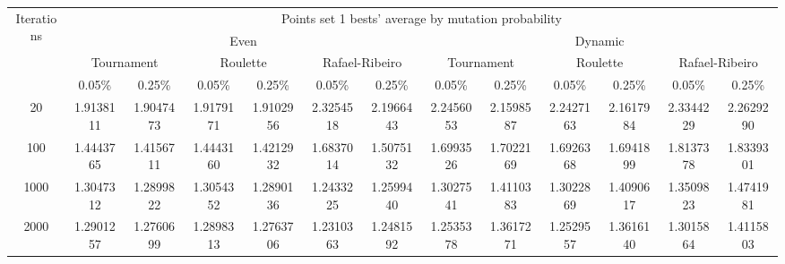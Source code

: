 \begin{center}
	\begin{tabular}{|c|c|c|c|c|c|c|c|c|c|c|c|c|}
		\hline
		\multirow{4}{*}{Iterations}	&	\multicolumn{12}{c|}{Points set 1 bests' average by mutation probability}	\\
										\cline{2-13}
									&	\multicolumn{6}{c|}{Even}																																												&	\multicolumn{6}{c|}{Dynamic} \\
									\cline{2-13}

									&	\multicolumn{2}{c|}{Tournament}							&	\multicolumn{2}{c|}{Roulette}							&	\multicolumn{2}{c|}{Rafael-Ribeiro}												&	\multicolumn{2}{c|}{Tournament}												&	\multicolumn{2}{c|}{Roulette}													&	\multicolumn{2}{c|}{Rafael-Ribeiro}												\\
									\cline{2-13}
									&	0.05\%			&	0.25\%								&	0.05\%			&	0.25\%								&	0.05\%									&	0.25\%								&	0.05\%								&	0.25\%								&	0.05\%									&	0.25\%								&	0.05\%								&	0.25\%									\\
		\noalign{\hrule height 1.5pt}
		20							&	1.9138111		& 	1.9047473 \cellcolor[gray]{0.9}		&	1.9179171		&	1.9102956 \cellcolor[gray]{0.9}		&	2.3254518								&	2.1966443 \cellcolor[gray]{0.9}		&	2.2456053							& 	2.1598587 \cellcolor[gray]{0.9}		&	2.2427163								&	2.1617984 \cellcolor[gray]{0.9}		&	2.3344229							&	2.2629290 \cellcolor[gray]{0.9}			\\
		\hline
		100							&	1.4443765		&	1.4156711 \cellcolor[gray]{0.9}		&	1.4443160		&	1.4212932 \cellcolor[gray]{0.9} 	&	1.6837014								&	1.5075132 \cellcolor[gray]{0.9}		&	1.6993526 \cellcolor[gray]{0.9}		& 	1.7022169							&	1.6926368 \cellcolor[gray]{0.9}			&	1.6941899							&	1.8137378 \cellcolor[gray]{0.9}		&	1.8339301								\\
		\hline
		1000						&	1.3047312		&	1.2899822 \cellcolor[gray]{0.9}		&	1.3054352		&	1.2890136 \cellcolor[gray]{0.9}		&	1.2433225 \cellcolor[gray]{0.9}			&	1.2599440							&	1.3027541 \cellcolor[gray]{0.9}		& 	1.4110383							&	1.3022869 \cellcolor[gray]{0.9}			&	1.4090617							&	1.3509823 \cellcolor[gray]{0.9}		&	1.4741981								\\
		\hline
		2000						&	1.2901257		&	1.2760699 \cellcolor[gray]{0.9}		&	1.2898313		&	1.2763706 \cellcolor[gray]{0.9}		&	1.2310363 \cellcolor[gray]{0.9}			&	1.2481592							&	1.2535378 \cellcolor[gray]{0.9}		& 	1.3617271							&	1.2529557 \cellcolor[gray]{0.9}			&	1.3616140							&	1.3015864 \cellcolor[gray]{0.9}		&	1.4115803								\\
		\hline
	\end{tabular}
	\label{tab:mutation_prob_type_1_best_avg}
\end{center}
